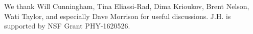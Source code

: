 \documentclass[aps,prl,twocolumn, superscriptaddress,groupedaddress,nofootinbib]{revtex4-1}
\newtheorem{prop}{Proposition}
\newcommand{\XXX}[3]{}
\begin{document}
 We thank Will Cunningham, Tina Eliassi-Rad, Dima Krioukov, Brent Nelson, Wati Taylor,
and especially Dave Morrison for useful discussions. 
J.H. is supported by
NSF Grant PHY-1620526.


\end{document}
